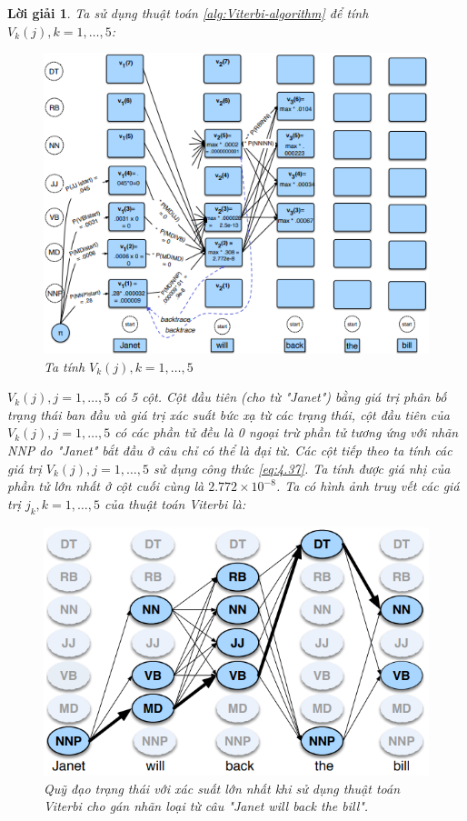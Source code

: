 \documentclass[14pt, a4paper]{article}
\numberwithin{equation}{section}
\numberwithin{figure}{section}
\theoremstyle{sltheorem}
\theoremstyle{soltheorem}
\newtheorem*{loigiai}{Lời giải}
\numberwithin{dl}{section}
\numberwithin{md}{section}
\numberwithin{vd}{section}
\begin{document}
    \begin{loigiai}
        Ta sử dụng thuật toán \ref{alg:Viterbi-algorithm} để tính $V_k(j), k=1,\dots,5$:

        \begin{figure}[h!]
            \centering
            \includegraphics[scale=0.8]{2.png}
            \caption{Ta tính $V_k(j), k=1,\dots,5$}
        \end{figure}

        $V_k(j), j=1, \dots, 5$ có 5 cột.
        Cột đầu tiên (cho từ "Janet") bằng giá trị phân bố trạng thái ban đầu và giá trị xác suất bức xạ từ các trạng thái, cột đầu tiên của $V_k(j), j=1, \dots, 5$ có các phần tử đều là 0 ngoại trừ phần tử tương ứng với nhãn NNP do "Janet" bắt đầu ở câu chỉ có thể là đại từ.
        Các cột tiếp theo ta tính các giá trị $V_k(j), j=1, \dots, 5$ sử dụng công thức \ref{eq:4.37}.
        Ta tính được giá nhị của phần tử lớn nhất ở cột cuối cùng là $2.772 \times 10^{-8}$.
        Ta có hình ảnh truy vết các giá trị $j_k, k=1, \dots, 5$ của thuật toán Viterbi là:

        \begin{figure}[h!]
            \centering
            \includegraphics[scale=0.6]{3.png}
            \caption{Quỹ đạo trạng thái với xác suất lớn nhất khi sử dụng thuật toán Viterbi cho gán nhãn loại từ câu "Janet will back the bill".}
        \end{figure}


\end{loigiai}
\end{document}
